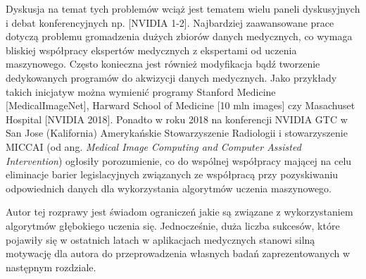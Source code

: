 Dyskusja na temat tych problemów wciąż jest tematem wielu paneli dyskusyjnych i debat konferencyjnych np. [NVIDIA 1-2]. Najbardziej zaawansowane prace dotyczą problemu gromadzenia dużych zbiorów danych medycznych, co wymaga bliskiej współpracy ekspertów medycznych z ekspertami od uczenia maszynowego. Często konieczna jest również modyfikacja bądź tworzenie dedykowanych programów do akwizycji danych medycznych. Jako przykłady takich inicjatyw można wymienić programy Stanford Medicine [MedicalImageNet], Harward School of Medicine [10 mln images] czy Masachuset Hospital [NVIDIA 2018]. Ponadto w roku 2018 na konferencji NVIDIA GTC w San Jose (Kalifornia) Amerykańskie Stowarzyszenie Radiologii i stowarzyszenie MICCAI (od ang. \textit{Medical Image Computing and Computer Assisted Intervention}) ogłosiły porozumienie, co do wspólnej współpracy mającej na celu eliminacje barier legislacyjnych związanych ze współpracą przy pozyskiwaniu odpowiednich danych dla wykorzystania algorytmów uczenia maszynowego.

Autor tej rozprawy jest świadom ograniczeń jakie są związane z wykorzystaniem algorytmów głębokiego uczenia się. Jednocześnie, duża liczba sukcesów, które pojawiły się w ostatnich latach w aplikacjach medycznych stanowi silną motywację dla autora do przeprowadzenia własnych badań zaprezentowanych w następnym rozdziale.


    
